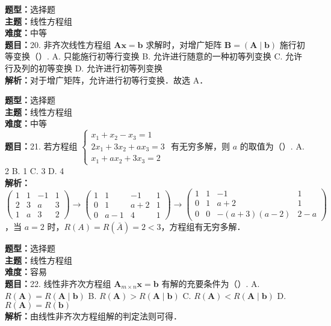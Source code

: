 \documentclass{ctexart}
\newenvironment{question}[5]{%
	\noindent\textbf{题型：}#1\\
	\textbf{主题：}#2\\
	\textbf{难度：}#3\\
	\textbf{题目：}#4\\
	\textbf{解析：}#5\\
	\vspace{1em}
}{}
\begin{document}
	
	
	\begin{question}
		{选择题}
		{线性方程组}
		{中等}
		{20. 非齐次线性方程组 \(\mathbf{A x}=\mathbf{b}\) 求解时，对增广矩阵 \(\mathbf{B}=(\mathbf{A} \mid \mathbf{b})\) 施行初等变换（）.
			A. 只能施行初等行变换
			B. 允许进行随意的一种初等列变换
			C. 允许行及列的初等变换
			D. 允许进行初等列变换}
		{对于增广矩阵，允许进行初等行变换．故选 A．}
	\end{question}
	
	\begin{question}
		{选择题}
		{线性方程组}
		{中等}
		{21. 若方程组 \(\left\{\begin{array}{l}x_1+x_2-x_3=1 \\ 2 x_1+3 x_2+a x_3=3 \\ x_1+a x_2+3 x_3=2\end{array}\right.\) 有无穷多解，则 \(a\) 的取值为（）.
			A. 2
			B. 1
			C. 3
			D. 4}
		{\(\left(\begin{array}{cccc}1 & 1 & -1 & 1 \\ 2 & 3 & a & 3 \\ 1 & a & 3 & 2\end{array}\right) \rightarrow\left(\begin{array}{cccc}1 & 1 & -1 & 1 \\ 0 & 1 & a+2 & 1 \\ 0 & a-1 & 4 & 1\end{array}\right) \rightarrow\left(\begin{array}{cccc}1 & 1 & -1 & 1 \\ 0 & 1 & a+2 & 1 \\ 0 & 0 & -(a+3)(a-2) & 2-a\end{array}\right)\)，当 \(a=2\) 时，\(R(A)=R(\bar{A})=2<3\)，方程组有无穷多解．}
	\end{question}
	
	\begin{question}
		{选择题}
		{线性方程组}
		{容易}
		{22. 线性非齐次方程组 \(\mathbf{A}_{m \times n} \mathbf{x}=\mathbf{b}\) 有解的充要条件为（）.
			A. \(R(\mathbf{A})=R(\mathbf{A} \mid \mathbf{b})\)
			B. \(R(\mathbf{A})>R(\mathbf{A} \mid \mathbf{b})\)
			C. \(R(\mathbf{A})<R(\mathbf{A} \mid \mathbf{b})\)
			D. \(R(\mathbf{A})=R(\mathbf{b})\)}
		{由线性非齐次方程组解的判定法则可得．}
	\end{question}
	
\end{document}

